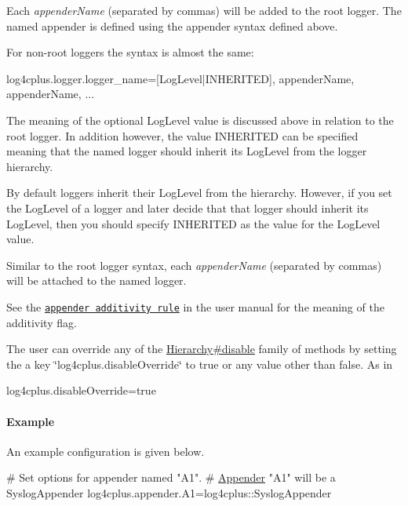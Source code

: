 Each {\itshape appender\-Name} (separated by commas) will be added to the root logger. The named appender is defined using the appender syntax defined above.

For non-\/root loggers the syntax is almost the same\-: 
\begin{DoxyPre}
log4cplus.logger.logger\_name=[LogLevel|INHERITED], appenderName, appenderName, ...
\end{DoxyPre}


The meaning of the optional Log\-Level value is discussed above in relation to the root logger. In addition however, the value I\-N\-H\-E\-R\-I\-T\-E\-D can be specified meaning that the named logger should inherit its Log\-Level from the logger hierarchy.

By default loggers inherit their Log\-Level from the hierarchy. However, if you set the Log\-Level of a logger and later decide that that logger should inherit its Log\-Level, then you should specify I\-N\-H\-E\-R\-I\-T\-E\-D as the value for the Log\-Level value.

Similar to the root logger syntax, each {\itshape appender\-Name} (separated by commas) will be attached to the named logger.

See the \href{../../../../manual.html#additivity}{\tt appender additivity rule} in the user manual for the meaning of the {\ttfamily additivity} flag.

The user can override any of the \hyperlink{classlog4cplus_1_1Hierarchy_adb298220a82bc8b0307539105ab73ae7}{Hierarchy\#disable} family of methods by setting the a key \char`\"{}log4cplus.\-disable\-Override\char`\"{} to {\ttfamily true} or any value other than false. As in 
\begin{DoxyPre}log4cplus.disableOverride=true \end{DoxyPre}


\paragraph*{Example}

An example configuration is given below.


\begin{DoxyPre}\end{DoxyPre}



\begin{DoxyPre}\# Set options for appender named "A1".
\# \hyperlink{classlog4cplus_1_1Appender}{Appender} "A1" will be a SyslogAppender
log4cplus.appender.A1=log4cplus::SyslogAppender\end{DoxyPre}



